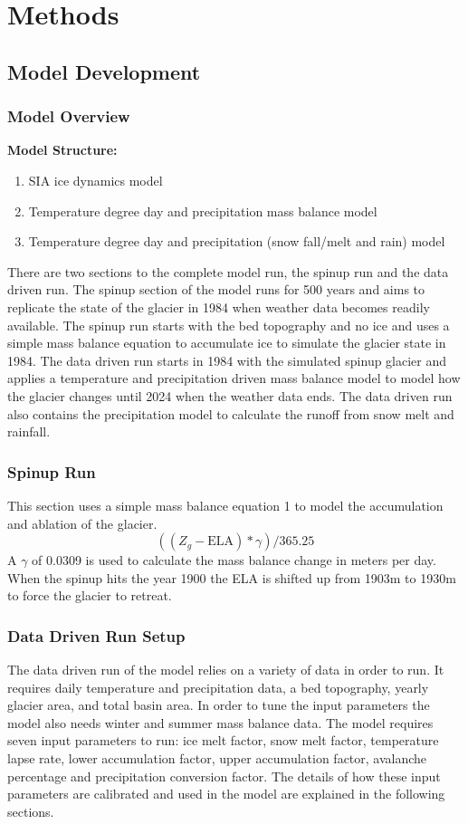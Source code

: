 \documentclass{article}
\begin{document}
\section{Methods}
\subsection{Model Development}
\subsubsection{Model Overview}
\textbf{Model Structure:}
\begin{enumerate}[leftmargin=2cm]
    \item SIA ice dynamics model
    \item Temperature degree day and precipitation mass balance model
    \item Temperature degree day and precipitation (snow fall/melt and rain) model
\end{enumerate}

There are two sections to the complete model run, the spinup run and the data driven run. The spinup section of the model runs for 500 years and aims to replicate the 
state of the glacier in 1984 when weather data becomes readily available. The spinup run starts with the bed topography and no ice and uses a simple mass balance 
equation to accumulate ice to simulate the glacier state in 1984. The data driven run starts in 1984 with the simulated spinup glacier and applies a temperature and 
precipitation driven mass balance model to model how the glacier changes until 2024 when the weather data ends. The data driven run also contains the precipitation model to calculate the runoff 
from snow melt and rainfall.

\subsubsection{Spinup Run}
This section uses a simple mass balance equation 1 to model the accumulation and ablation of the glacier.
\begin{equation}((Z_g-\text{ELA})*\gamma)/365.25\label{tab:simple_mb_eq}\end{equation}
A $\gamma$ of 0.0309 is used to calculate the mass balance change in meters per day. When the spinup hits the year 1900 the ELA is shifted up from 1903m to 1930m to force the 
glacier to retreat. 

\subsubsection{Data Driven Run Setup}
The data driven run of the model relies on a variety of data in order to run. It requires daily temperature and precipitation data, 
a bed topography, yearly glacier area, and total basin area. In order to tune the input parameters the model also needs winter and summer mass balance 
data. The model requires seven input parameters to run: ice melt factor, snow melt factor, temperature lapse rate, lower accumulation factor, upper 
accumulation factor, avalanche percentage and precipitation conversion factor. The details of how these input parameters are calibrated and used 
in the model are explained in the following sections.
\end{document}
